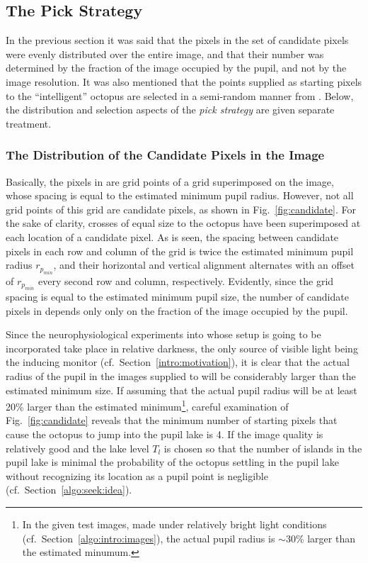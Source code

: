 \subsection{The Pick Strategy}
\label{algo:seek:strategy}

In the previous section it was said that the pixels in the set {\SS}
of candidate pixels were evenly distributed over the entire image, and
that their number was determined by the fraction of the image occupied
by the pupil, and not by the image resolution.  It was also mentioned
that the points supplied as starting pixels to the ``intelligent''
octopus are selected in a semi-random manner from {\SS}.  Below, the
distribution and selection aspects of the {\em pick strategy\/} are
given separate treatment.

\subsubsection{The Distribution of the Candidate Pixels in the Image}


Basically, the pixels in {\SS} are grid points of a grid superimposed
on the image, whose spacing is equal to the estimated minimum pupil
radius.  However, not all grid points of this grid are candidate
pixels, as shown in Fig.~\ref{fig:candidate}.  For the sake of
clarity, crosses of equal size to the octopus have been superimposed at
each location of a candidate pixel.  As is seen, the spacing between
candidate pixels in each row and column of the grid is twice the
estimated minimum pupil radius $r_{p_{min}}$, and their horizontal and
vertical alignment alternates with an offset of $r_{p_{min}}$ every
second row and column, respectively.  Evidently, since the grid
spacing is equal to the estimated minimum pupil size, the number of
candidate pixels in {\SS} depends only only on the fraction of the
image occupied by the pupil.

Since the neurophysiological experiments into whose setup {\octopus}
is going to be incorporated take place in relative darkness, the only
source of visible light being the inducing monitor (cf.\ 
Section~\ref{intro:motivation}), it is clear that the actual radius of
the pupil in the images supplied to {\octopus} will be considerably
larger than the estimated minimum size.  If assuming that the actual
pupil radius will be at least 20\% larger than the estimated
minimum\footnote{In the given test images, made under relatively
  bright light conditions (cf.\ Section~\ref{algo:intro:images}), the
  actual pupil radius is $\sim 30\%$ larger than the estimated
  minumum.}, careful examination of Fig.~\ref{fig:candidate} reveals
that the minimum number of starting pixels that cause the octopus to
jump into the pupil lake is 4.  If the image quality is relatively
good and the lake level $T_{l}$ is chosen so that the number of
islands in the pupil lake is minimal the probability of the octopus
settling in the pupil lake without recognizing its location as a pupil
point is negligible (cf.\ Section~\ref{algo:seek:idea}).

